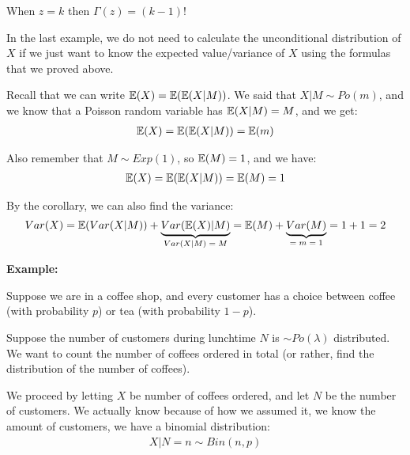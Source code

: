 \noindent When $z = k$ then $\Gamma(z) = (k-1)!$
\par\bigskip
\noindent In the last example, we do not need to calculate the unconditional distribution of $X$ if we just want to know the expected value/variance of $X$ using the formulas that we proved above.
\par\bigskip
\noindent Recall that we can write $\mathbb{E}(X) = \mathbb{E}(\mathbb{E}(X|M))$. We said that $X|M\sim Po(m)$, and we know that a Poisson random variable has $\mathbb{E}(X|M) = M$, and we get:
\begin{equation*}
  \begin{gathered}
    \mathbb{E}(X) = \mathbb{E}(\mathbb{E}(X|M)) = \mathbb{E}(m)
  \end{gathered}
\end{equation*}\par
\noindent Also remember that $M\sim Exp(1)$, so $\mathbb{E}(M) = 1$, and we have:
\begin{equation*}
  \begin{gathered}
    \mathbb{E}(X) = \mathbb{E}(\mathbb{E}(X|M)) = \mathbb{E}(M) = 1
  \end{gathered}
\end{equation*}\par
\noindent By the corollary, we can also find the variance:
\begin{equation*}
  \begin{gathered}
    Var(X) = \mathbb{E}(Var(X|M))+\underbrace{Var(\mathbb{E}(X)|M)}_{\text{$Var(X|M) = M$}} = \mathbb{E}(M)+\underbrace{Var(M)}_{\text{$=m=1$}} = 1+1 = 2
  \end{gathered}
\end{equation*}
\par\bigskip
\noindent\textbf{Example:}\par
\noindent Suppose we are in a coffee shop, and every customer has a choice between coffee (with probability $p$) or tea (with probability $1-p$).\par
\noindent Suppose the number of customers during lunchtime $N$ is $\sim Po(\lambda)$ distributed. We want to count the number of coffees ordered in total (or rather, find the distribution of the number of coffees).
\par\bigskip
\noindent We proceed by letting $X$ be number of coffees ordered, and let $N$ be the number of customers. We actually know because of how we assumed it, we know the amount of customers, we have a binomial distribution:
\begin{equation*}
  \begin{gathered}
    X|N=n\sim Bin(n,p)
  \end{gathered}
\end{equation*}
